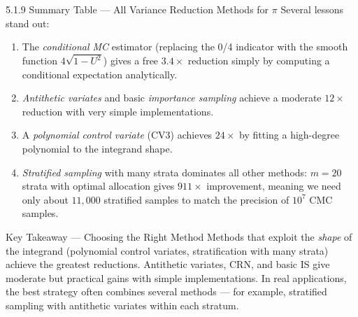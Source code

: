 \documentclass[aspectratio=169,10pt]{beamer}
\begin{document}
\begin{frame}[allowframebreaks]{5.1.9 Summary Table --- All Variance Reduction Methods for $\pi$}
Several lessons stand out:
\begin{enumerate}
  \item The \emph{conditional MC} estimator (replacing the 0/4 indicator with
        the smooth function $4\sqrt{1-U^2}$) gives a free $3.4\times$ reduction
        simply by computing a conditional expectation analytically.
  \item \emph{Antithetic variates} and basic \emph{importance sampling} achieve
        a moderate $12\times$ reduction with very simple implementations.
  \item A \emph{polynomial control variate} (CV3) achieves $24\times$ by
        fitting a high-degree polynomial to the integrand shape.
  \item \emph{Stratified sampling} with many strata dominates all other methods:
        $m = 20$ strata with optimal allocation gives $911\times$ improvement,
        meaning we need only about $11{,}000$ stratified samples to match the
        precision of $10^7$ CMC samples.
\end{enumerate}

\begin{alertblock}{Key Takeaway --- Choosing the Right Method}
  Methods that exploit the \emph{shape} of the integrand (polynomial control
  variates, stratification with many strata) achieve the greatest reductions.
  Antithetic variates, CRN, and basic IS give moderate but practical gains with
  simple implementations.
  In real applications, the best strategy often combines several methods ---
  for example, stratified sampling with antithetic variates within each stratum.
\end{alertblock}

\end{frame}

\end{document}
